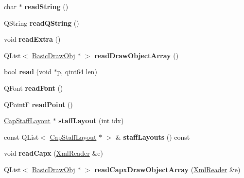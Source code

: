 \begin{DoxyCompactItemize}
char $\ast$ {\bfseries read\+String} ()
\item 
\mbox{\label{class_ms_1_1_capella_a8b53d644db851137d368bd88b9529435}} 
Q\+String {\bfseries read\+Q\+String} ()
\item 
\mbox{\label{class_ms_1_1_capella_a52426c45c6c51a4905b439f228ed0151}} 
void {\bfseries read\+Extra} ()
\item 
\mbox{\label{class_ms_1_1_capella_a2b49bc3e3e1e96497c1aaecbbcd9872e}} 
Q\+List$<$ \hyperlink{class_ms_1_1_basic_draw_obj}{Basic\+Draw\+Obj} $\ast$ $>$ {\bfseries read\+Draw\+Object\+Array} ()
\item 
\mbox{\label{class_ms_1_1_capella_a4b07c03709a971b5d4e5e1bd67fc3c5e}} 
bool {\bfseries read} (void $\ast$p, qint64 len)
\item 
\mbox{\label{class_ms_1_1_capella_a81c0760495e07b1f69805268f4aedd66}} 
Q\+Font {\bfseries read\+Font} ()
\item 
\mbox{\label{class_ms_1_1_capella_a86a3f57e56dfc9441b51a5041d1190e1}} 
Q\+PointF {\bfseries read\+Point} ()
\item 
\mbox{\label{class_ms_1_1_capella_a7568abd0a77b75e3d3beed6b7606747e}} 
\hyperlink{struct_ms_1_1_cap_staff_layout}{Cap\+Staff\+Layout} $\ast$ {\bfseries staff\+Layout} (int idx)
\item 
\mbox{\label{class_ms_1_1_capella_a3b85514243452b56a736a3b357079aba}} 
const Q\+List$<$ \hyperlink{struct_ms_1_1_cap_staff_layout}{Cap\+Staff\+Layout} $\ast$ $>$ \& {\bfseries staff\+Layouts} () const
\item 
\mbox{\label{class_ms_1_1_capella_af49d9100d295b6d4b5504ec69286b1ee}} 
void {\bfseries read\+Capx} (\hyperlink{class_ms_1_1_xml_reader}{Xml\+Reader} \&e)
\item 
\mbox{\label{class_ms_1_1_capella_a7abfbcdea391c279a4c9689c7bdd37b4}} 
Q\+List$<$ \hyperlink{class_ms_1_1_basic_draw_obj}{Basic\+Draw\+Obj} $\ast$ $>$ {\bfseries read\+Capx\+Draw\+Object\+Array} (\hyperlink{class_ms_1_1_xml_reader}{Xml\+Reader} \&e)
\end{DoxyCompactItemize}
